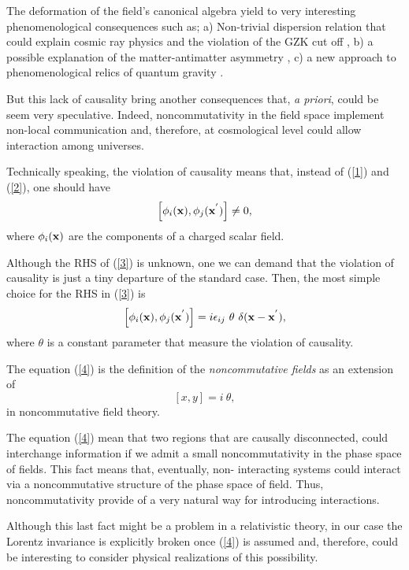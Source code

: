 \documentclass[a4paper,aps,twocolumn,amsfonts]{revtex4}
\begin{document}
   The deformation of the field's canonical algebra yield to very interesting phenomenological consequences such as; a) Non-trivial dispersion relation \cite{ccgm}  that could explain cosmic ray physics and the violation of the GZK cut off \cite{gzk}, b) a possible explanation of the matter-antimatter asymmetry \cite{rubi}  , c) a new approach to phenomenological relics of quantum gravity \cite{alot}.

   But this lack of causality bring another consequences that, {\it a priori}, could be seem very speculative. Indeed, noncommutativity in the field space implement non-local communication and, therefore, at cosmological level could allow interaction among universes.

Technically speaking, the violation of causality means that, instead of (\ref{1}) and (\ref{2}), one should have
   \begin{equation}
   \left[ \phi_i ({\bf x}), \phi_j ({\bf x}^{'})\right] \neq 0,
   \label{3}
   \end{equation}
   where $\phi_i ({\bf x})$ are the components of a  charged scalar field.

   Although the RHS of (\ref{3}) is unknown, one we can demand that the violation of causality is just a tiny departure of the standard case. Then,  the most simple choice for the RHS in (\ref{3}) is
   \begin{equation}
   \left[ \phi_i ({\bf x}), \phi_j ({\bf x}^{'})\right] = i \epsilon_{ij} ~\theta~
   \delta ( {\bf x} -{\bf x}^{'}),
   \label{4}
   \end{equation}
   where $\theta$ is a constant parameter that measure the violation of causality.

   The equation (\ref{4}) is the definition of the {\it noncommutative fields} as an extension of
   \[
   \left[ x,y\right] = i~ \theta,
   \]
   in noncommutative field theory.

   The equation (\ref{4}) mean that two regions that are causally disconnected, could interchange information if we admit a small noncommutativity  in the phase space of fields.  This fact means that, eventually,  non- interacting systems could interact via a noncommutative structure of the phase space of field. Thus, noncommutativity provide of a very natural way  for introducing interactions.

Although this last fact might be a problem  in a relativistic theory, in our case  the Lorentz invariance is explicitly broken once (\ref{4}) is assumed and, therefore, could be interesting to consider physical realizations of this  possibility.
\end{document}
